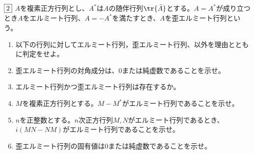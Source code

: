 \begin{tcolorbox} %
	$\fbox{2}$ $A$を複素正方行列とし、$A^*$は$A$の随伴行列$\tr{\bar{A}}$とする。$A= A^*$が成り立つとき$A$をエルミート行列、$A= -A^*$を満たすとき、$A$を歪エルミート行列という。
\begin{enumerate}
	\item 以下の行列に対してエルミート行列，歪エルミート行列、以外を理由とともに判定をせよ。
	\item 歪エルミート行列の対角成分は、0または純虚数であることを示せ。
	\item エルミート行列かつ歪エルミート行列は存在するか。
	\item $M$を複素正方行列とする。$M- M^*$がエルミート行列であることを示せ。
	\item $n$を正整数とする。$n$次正方行列$M, N$がエルミート行列であるとき、$i(MN- NM)$がエルミート行列であることを示せ。
	\item 歪エルミート行列の固有値は0または純虚数であることを示せ。
\end{enumerate}
\end{tcolorbox}

